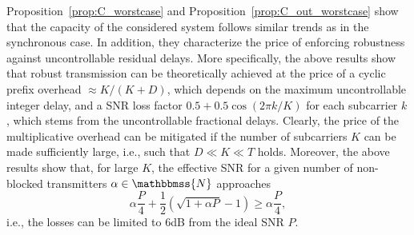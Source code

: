 \documentclass[10pt,journal,a4paper]{IEEEtran}
\newcommand{\stdset}[1]{\mathbbmss{#1}}	%
\begin{document}
Proposition~\ref{prop:C_worstcase} and Proposition~\ref{prop:C_out_worstcase} show that the capacity of the considered system follows similar trends as in the synchronous case. In addition, they characterize the price of enforcing robustness against uncontrollable residual delays. More specifically, the above results show that  robust transmission can be theoretically achieved at the price of a  cyclic prefix overhead $\approx K/(K+D)$, which depends on the maximum uncontrollable integer delay, and a SNR loss factor $0.5+0.5 \cos(2\pi k /K)$ for each subcarrier $k$, which stems from the uncontrollable fractional delays. Clearly, the price of the multiplicative overhead can be mitigated if the number of subcarriers $K$ can be made sufficiently large, i.e., such that $D \ll K \ll T$ holds. Moreover, the above results show that, for large $K$, the effective SNR for a given number of non-blocked transmitters $\alpha\in \stdset{N}$ approaches 
\begin{equation*}
\alpha \frac{P}{4}+\frac{1}{2}(\sqrt{1+\alpha P}-1) \geq \alpha \frac{P}{4},
\end{equation*}
i.e., the losses can be limited to $6$dB from the ideal SNR $P$.
\end{document}
